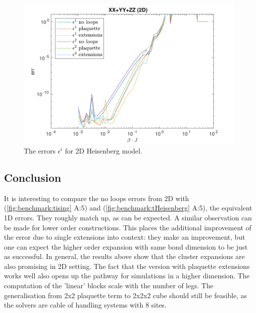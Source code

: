 \begin{figure}[!htbp]
  \center
  \includegraphics[width=\textwidth]{Figuren/benchmarking/2D_Err01_heis.pdf}
  \caption{The errors $\epsilon^i$ for 2D Heisenberg model. }
  \label{fig:res2d:n1:heis}
\end{figure}

\subsection{Conclusion}

It is interesting to compare the no loops errors from 2D with (\cref{fig:benchmark:tising} A:5) and (\cref{fig:benchmark:tHeisenberg} A:5), the equivalent 1D errors.  They roughly match up, as can be expected. A similar observation can be made for lower order constructions.  This places the additional improvement of the error due to single extensions into context: they make an improvement, but one can expect the higher order expansion with same bond dimension to be just as successful.  In general, the results above show that the cluster expansions are also promising in 2D setting. The fact that the version with plaquette extensions works well also opens up the pathway for simulations in a higher dimension. The computation of the 'linear' blocks scale with the number of legs. The generalisation from 2x2 plaquette term to 2x2x2 cube should still be feasible, as the solvers are cable of handling systems with 8 sites.